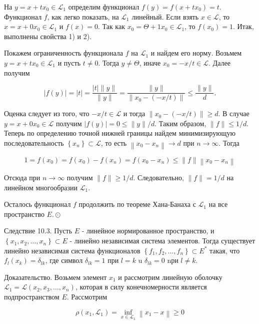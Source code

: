 На $y=x+t x_{0} \in \mathcal{L}_{1}$ определим функционал $f(y)=f\left(x+t x_{0}\right)=t$. Функционал $f$, как легко показать, на $\mathcal{L}_{1}$ линейный. Если взять $x \in \mathcal{L}$, то $x=x+0 x_{0} \in \mathcal{L}_{1}$ и $f(x)=0$. Так как $x_{0}=\Theta+1 x_{0} \in \mathcal{L}_{1}$, то $f\left(x_{0}\right)=1$. Итак, выполнены свойства 1) и 2).

Покажем ограниченность функционала $f$ на $\mathcal{L}_{1}$ и найдем его норму. Возьмем $y=x+t x_{0} \in \mathcal{L}_{1}$ и пусть $t \neq 0$. Тогда $y \neq \Theta$, иначе $x_{0}=-x / t \in \mathcal{L}$. Далее получим

\[
|f(y)|=|t|=\frac{|t|\|y\|}{\|y\|}=\frac{\|y\|}{\left\|x_{0}-(-x / t)\right\|} \leq \frac{\|y\|}{d} .
\]

Оценка следует из того, что $-x / t \in \mathcal{L}$ и тогда $\left\|x_{0}-(-x / t)\right\| \geq d$. В случае $y=x+0 x_{0} \in \mathcal{L}$ получим $|f(y)|=0 \leq\|y\| / d$. Таким образом, $\|f\| \leq 1 / d$. Теперь по определению точной нижней границы найдем минимизирующую последовательность $\left\{x_{n}\right\} \subset \mathcal{L}$, то есть $\left\|x_{0}-x_{n}\right\| \rightarrow d$ при $n \rightarrow \infty$. Тогда

\[
1=f\left(x_{0}\right)=f\left(x_{0}\right)-f\left(x_{n}\right)=f\left(x_{0}-x_{n}\right) \leq\|f\|\left\|x_{0}-x_{n}\right\|
\]

Отсюда при $n \rightarrow \infty$ получим $\|f\| \geq 1 / d$. Следовательно, $\|f\|=1 / d$ на линейном многообразии $\mathcal{L}_{1}$.

Осталось функционал $f$ продолжить по теореме Хана-Банаха с $\mathcal{L}_{1}$ на все пространство $E . \odot$

Следствие 10.3. Пусть $E$ - линейное нормированное пространство, $и$ $\left\{x_{1}, x_{2}, \ldots, x_{n}\right\} \subset E$ - линейно независимая система элементов. Тогда существует линейно независимая система функционалов $\left\{f_{1}, f_{2}, \ldots, f_{n}\right\} \subset E^{*}$ такая, что $f_{l}\left(x_{k}\right)=\delta_{l k}$, где символ $\delta_{l k}=1$ при $l=k$ u $\delta_{l k}=0$ nри $l \neq k$.

Доказательство. Возьмем элемент $x_{1}$ и рассмотрим линейную оболочку $\mathcal{L}_{1}=\mathscr{L}\left(x_{2}, x_{3}, \ldots, x_{n}\right)$, которая в силу конечномерности является подпространством $E$. Рассмотрим

\[
\rho\left(x_{1}, \mathcal{L}_{1}\right)=\inf _{x \in \mathcal{L}_{1}}\left\|x_{1}-x\right\| \geq 0
\]


